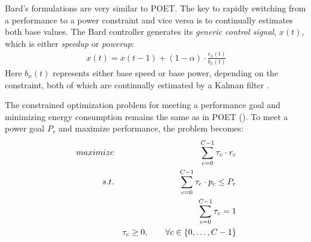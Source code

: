 Bard's formulations are very similar to POET.
The key to rapidly switching from a performance to a power constraint and vice versa is to continually estimates both base values.
The Bard controller generates its \emph{generic control signal}, $x(t)$, which is either \emph{speedup} or \emph{powerup}:
\begin{eqnarray}
  x(t) = x(t-1) + (1-\alpha) \cdot \frac{e_x(t)}{b_x(t)}
  \label{eqn:bard-xup-control}
\end{eqnarray}
Here $b_x(t)$ represents either base speed or base power, depending on the constraint, both of which are continually estimated by a Kalman filter \cite{welch2006kalman}.

The constrained optimization problem for meeting a performance goal and minimizing energy consumption remains the same as in POET ().
To meet a power goal $P_r$ and maximize performance, the problem becomes:
\begin{eqnarray}
  \maximize && \sum_{c=0}^{C-1} \tau_c \cdot r_c \label{eqn:bard-timing} \\
  \st %
  && \sum_{c=0}^{C-1} \tau_c \cdot p_c \le P_r \label{eqn:bard-power} \\
  && \sum_{c=0}^{C-1} \tau_c = 1 \label{eqn:work} \\
  && \tau_c \ge 0, \qquad \forall c \in \{0,\ldots,C-1\} \label{eqn:bard-time}
\end{eqnarray}

